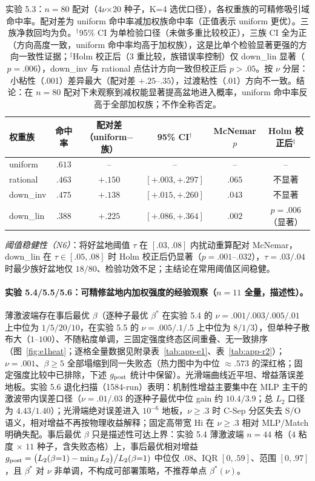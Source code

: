 \documentclass[fontset=windows,11pt]{ctexart}
\numberwithin{equation}{section}
\begin{document}
\begin{table}[ht]\centering\small\renewcommand{\arraystretch}{1.2}
\begin{tabular}{lccccc}
\toprule
权重族 & 命中率 & 配对差（uniform$-$族） & 95\% CI$^\dagger$ & McNemar $p$ & Holm 校正后$^\ddagger$\\
\midrule
uniform & $.613$ & -- & -- & -- & --\\
rational & $.463$ & $+.150$ & $[+.003,+.297]$ & $.065$ & 不显著\\
down\_inv & $.475$ & $+.138$ & $[+.015,+.260]$ & $.043$ & 不显著\\
down\_lin & $.388$ & $+.225$ & $[+.086,+.364]$ & $.002$ & $p=.006$（显著）\\
\bottomrule
\end{tabular}
\caption{实验 5.3：$n=80$ 配对（4$\nu$×20 种子，K=4 选优口径），各权重族的可精修吸引域命中率。配对差为 uniform 命中率减加权族命中率（正值表示 uniform 更优）。三族净救回均为负。$^\dagger$95\% CI 为单检验口径（未做多重比较校正），三族 CI 全为正（方向高度一致，uniform 命中率均高于加权族），这是比单个检验显著更强的方向一致性证据；$^\ddagger$Holm 校正后（3 重比较，族错误率控制）仅 down\_lin 显著（$p=.006$），down\_inv 与 rational 点估计方向一致但校正后 $p>.05$。按 $\nu$ 分层：小粘性（.001）差异最大（配对差 $+.25$--$.35$），过渡粘性（.01）方向不一致。结论：在 $n=80$ 配对下未观察到减权能显著提高盆地进入概率，uniform 命中率反高于全部加权族；不作全称否定。}\label{tab:g1b}
\end{table}

\noindent\emph{阈值稳健性（N6）}：将好盆地阈值 $\tau$ 在 $[.03,.08]$ 内扰动重算配对 McNemar，down\_lin 在 $\tau\in[.05,.08]$ 时 Holm 校正后仍显著（$p=.001$--$.032$），$\tau=.03/.04$ 时最少族好盆地仅 $18/80$、检验功效不足；主结论在常用阈值区间稳健。

\paragraph{实验 5.4/5.5/5.6：可精修盆地内加权强度的经验观察（$n=11$ 全量，描述性）。}
薄激波端存在事后最优 $\beta$（逐种子最优 $\beta^*$ 在实验 5.4 的 $\nu=.001/.003/.005/.01$ 上中位为 $1/5/20/10$，在实验 5.5 的 $\nu=.005/.1/.5$ 上中位为 $8/1/3$），但单种子散布大（$1$--$100$）、不随粘度单调，三固定强度终态区间重叠、无一致排序（图~\ref{fig:e1heat}；逐格全量数据见附录表~\ref{tab:app-e1}、表~\ref{tab:app-r2}）；$\nu=.001$、$\beta\ge5$ 全部塌缩到同一失败态（热力图中为中位 $\approx.573$ 的深红格；固定强度比较中已排除，下述 $g_{\rm post}$ 统计中保留）。光滑端曲线近平坦、增益落误差地板。实验 5.6 退化扫描（1584-run）表明：机制性增益主要集中在 MLP 主干的激波带内误差口径（$\nu=.01/.03$ 的逐种子最优中位 gain 约 $10.4/3.9$；总 $L_2$ 口径为 $4.43/1.40$）；光滑端绝对误差进入 $10^{-6}$ 地板，$\nu\ge.3$ 时 C-Sep 分区失去 S/O 语义，相对增益不再按物理收益解释；固定高带宽 Hi 在 $\nu\ge.3$ 相对 MLP/Match 明确失配。事后最优 $\beta$ 只是描述性可达上界：实验 5.4 薄激波端 $n=44$ 格（$4$ 粘度 $\times$ $11$ 种子，含失败态格）上，事后最优相对增益 $g_{\rm post}=\big(L_2(\beta{=}1)-\min_\beta L_2\big)\big/L_2(\beta{=}1)$ 中位仅 $.08$、IQR $[0,.59]$、范围 $[0,.97]$，且 $\beta^*$ 对 $\nu$ 非单调，不构成可部署策略，不推荐单点 $\beta^*(\nu)$。
\end{document}
